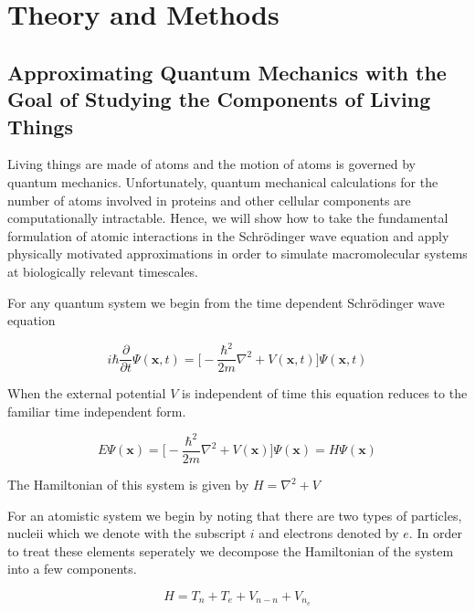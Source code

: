 \chapter{Theory and Methods}
\label{chap:methods}

\section{Approximating Quantum Mechanics with the Goal of Studying the Components of Living Things}
Living things are made of atoms and the motion of atoms is governed by quantum mechanics. Unfortunately, quantum mechanical calculations for the number of atoms involved in proteins and other cellular components are computationally intractable. Hence, we will show how to take the fundamental formulation of atomic interactions in the Schr\"{o}dinger wave equation and apply physically motivated approximations in order to simulate macromolecular systems at biologically relevant timescales. 

For any quantum system we begin from the time dependent Schr\"{o}dinger wave equation 

\begin{equation}
i\hbar \frac {\partial}{\partial t} \Psi (\textbf{x},t) = \big[ -\frac{\hbar ^2}{2m}\nabla^2 + V (\textbf{x}, t) \big] \Psi (\textbf{x},t) 
\end{equation}

When the external potential $V$ is independent of time this equation reduces to the familiar time independent form.

\begin{equation}
	E \Psi (\textbf{x}) = \big[ -\frac{\hbar ^2}{2m}\nabla^2 + V (\textbf{x}) \big] \Psi (\textbf{x}) = H \Psi(\textbf{x}) 
 \end{equation}

The Hamiltonian of this system is given by $H = \nabla^2 + V$ 

For an atomistic system we begin by noting that there are two types of particles, nucleii which we denote with the subscript $i$ and electrons denoted by $e$. In order to treat these elements seperately we decompose the Hamiltonian of the system into a few components. 

\begin {equation}
H = T_n + T_e + V_{n-n} + V_{n_e}
\end{equation}
